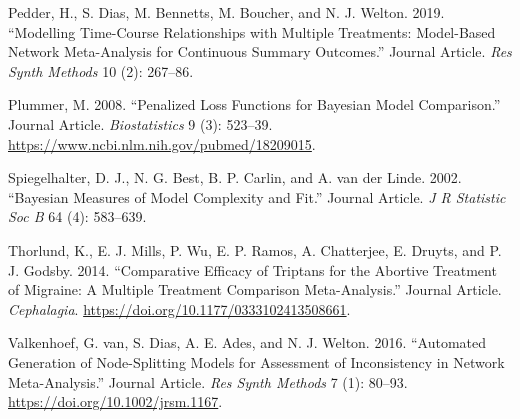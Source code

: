 \documentclass[]{article}
\begin{document}
\leavevmode\hypertarget{ref-pedder2019}{}%
Pedder, H., S. Dias, M. Bennetts, M. Boucher, and N. J. Welton. 2019.
``Modelling Time-Course Relationships with Multiple Treatments:
Model-Based Network Meta-Analysis for Continuous Summary Outcomes.''
Journal Article. \emph{Res Synth Methods} 10 (2): 267--86.

\leavevmode\hypertarget{ref-plummer2008}{}%
Plummer, M. 2008. ``Penalized Loss Functions for Bayesian Model
Comparison.'' Journal Article. \emph{Biostatistics} 9 (3): 523--39.
\url{https://www.ncbi.nlm.nih.gov/pubmed/18209015}.

\leavevmode\hypertarget{ref-spiegelhalter2002}{}%
Spiegelhalter, D. J., N. G. Best, B. P. Carlin, and A. van der Linde.
2002. ``Bayesian Measures of Model Complexity and Fit.'' Journal
Article. \emph{J R Statistic Soc B} 64 (4): 583--639.

\leavevmode\hypertarget{ref-thorlund2014}{}%
Thorlund, K., E. J. Mills, P. Wu, E. P. Ramos, A. Chatterjee, E. Druyts,
and P. J. Godsby. 2014. ``Comparative Efficacy of Triptans for the
Abortive Treatment of Migraine: A Multiple Treatment Comparison
Meta-Analysis.'' Journal Article. \emph{Cephalagia}.
\url{https://doi.org/10.1177/0333102413508661}.

\leavevmode\hypertarget{ref-vanvalkenhoef2016}{}%
Valkenhoef, G. van, S. Dias, A. E. Ades, and N. J. Welton. 2016.
``Automated Generation of Node-Splitting Models for Assessment of
Inconsistency in Network Meta-Analysis.'' Journal Article. \emph{Res
Synth Methods} 7 (1): 80--93. \url{https://doi.org/10.1002/jrsm.1167}.
\end{document}
